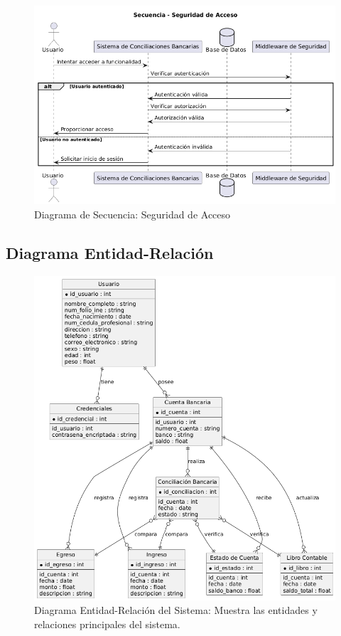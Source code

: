 \documentclass{article}
\begin{document}
\begin{figure}[H]
    \centering
    \includegraphics[width=\textwidth]{secuencia/SeguridadAcceso.png}
    \caption{Diagrama de Secuencia: Seguridad de Acceso}
\end{figure}


\subsection{Diagrama Entidad-Relación}
\begin{figure}[H]
    \centering
    \includegraphics[width=\textwidth]{casos/EntidadRelacion.png}
    \caption{Diagrama Entidad-Relación del Sistema: Muestra las entidades y relaciones principales del sistema.}
\end{figure}
\end{document}
